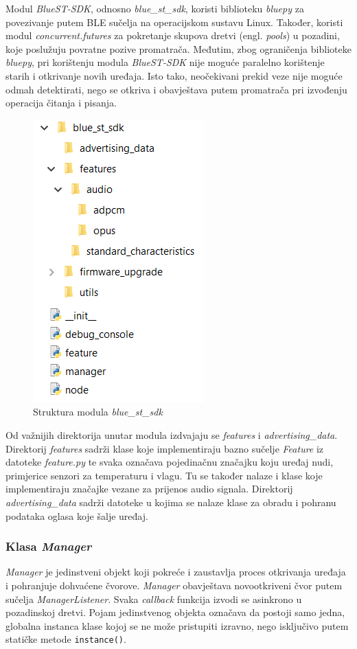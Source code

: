Modul \textit{BlueST-SDK}, odnosno \textit{blue\_st\_sdk}, koristi biblioteku \textit{bluepy} za povezivanje putem BLE sučelja na operacijskom sustavu Linux. Također, koristi modul \textit{concurrent.futures} za pokretanje skupova dretvi (engl. \textit{pools}) u pozadini, koje poslužuju povratne pozive promatrača. Međutim, zbog ograničenja biblioteke \textit{bluepy}, pri korištenju modula \textit{BlueST-SDK} nije moguće paralelno korištenje starih i otkrivanje novih uređaja. Isto tako, neočekivani prekid veze nije moguće odmah detektirati, nego se otkriva i obavještava putem promatrača pri izvođenju operacija čitanja i pisanja. \cite{bluest_py}

\begin{figure}[ht]
	\centering
	\includegraphics[scale=0.8]{imgs/sdk_folder_struct}
	\caption{Struktura modula \textit{blue\_st\_sdk}}
	\label{fig:sdk_folder_struct}
\end{figure}

Od važnijih direktorija unutar modula izdvajaju se \textit{features} i \textit{advertising\_data}. Direktorij \textit{features} sadrži klase koje implementiraju bazno sučelje \textit{Feature} iz datoteke \textit{feature.py} te svaka označava pojedinačnu značajku koju uređaj nudi, primjerice senzori za temperaturu i vlagu. Tu se također nalaze i klase koje implementiraju značajke vezane za prijenos audio signala. Direktorij \textit{advertising\_data} sadrži datoteke u kojima se nalaze klase za obradu i pohranu podataka oglasa koje šalje uređaj. 


\subsubsection{Klasa \textit{Manager}}
\textit{Manager} je jedinstveni objekt koji pokreće i zaustavlja proces otkrivanja uređaja i pohranjuje dohvaćene čvorove. \textit{Manager} obavještava novootkriveni čvor putem sučelja \textit{ManagerListener}. Svaka \textit{callback} funkcija izvodi se asinkrono u pozadinskoj dretvi. Pojam jedinstvenog objekta označava da postoji samo jedna, globalna instanca klase kojoj se ne može pristupiti izravno, nego isključivo putem statičke metode \lstinline|instance()|.

